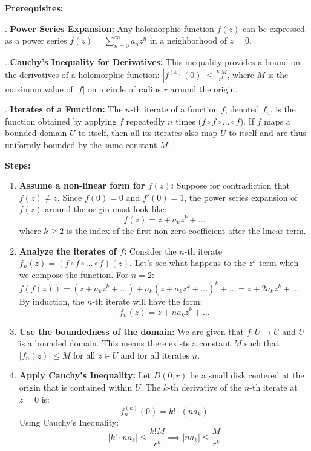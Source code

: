 \begin{solution}
\textbf{Prerequisites:}
\par{}. \textbf{Power Series Expansion:} Any holomorphic function $f(z)$ can be expressed as a power series $f(z) = \sum_{n=0}^\infty a_n z^n$ in a neighborhood of $z=0$.
\par{}. \textbf{Cauchy's Inequality for Derivatives:} This inequality provides a bound on the derivatives of a holomorphic function: $|f^{(k)}(0)| \leq \frac{k! M}{r^k}$, where $M$ is the maximum value of $|f|$ on a circle of radius $r$ around the origin.
\par{}. \textbf{Iterates of a Function:} The $n$-th iterate of a function $f$, denoted $f_n$, is the function obtained by applying $f$ repeatedly $n$ times ($f \circ f \circ \dots \circ f$). If $f$ maps a bounded domain $U$ to itself, then all its iterates also map $U$ to itself and are thus uniformly bounded by the same constant $M$.
\par\medskip
\textbf{Steps:}
\begin{enumerate}
    \item \textbf{Assume a non-linear form for $f(z)$:} Suppose for contradiction that $f(z) \neq z$. Since $f(0)=0$ and $f'(0)=1$, the power series expansion of $f(z)$ around the origin must look like:
    \[ f(z) = z + a_k z^k + \dots \]
    where $k \geq 2$ is the index of the first non-zero coefficient after the linear term.

    \item \textbf{Analyze the iterates of $f$:} Consider the $n$-th iterate $f_n(z) = (f \circ f \circ \dots \circ f)(z)$. Let's see what happens to the $z^k$ term when we compose the function. 
    For $n=2$: $f(f(z)) = (z + a_k z^k + \dots) + a_k (z + a_k z^k + \dots)^k + \dots = z + 2a_k z^k + \dots$ 
    By induction, the $n$-th iterate will have the form:
    \[ f_n(z) = z + n a_k z^k + \dots \]

    \item \textbf{Use the boundedness of the domain:} We are given that $f: U \to U$ and $U$ is a bounded domain. This means there exists a constant $M$ such that $|f_n(z)| \leq M$ for all $z \in U$ and for all iterates $n$.

    \item \textbf{Apply Cauchy's Inequality:} Let $D(0, r)$ be a small disk centered at the origin that is contained within $U$. The $k$-th derivative of the $n$-th iterate at $z=0$ is:
    \[ f_n^{(k)}(0) = k! \cdot (n a_k) \]
    Using Cauchy's Inequality:
    \[ |k! \cdot n a_k| \leq \frac{k! M}{r^k} \implies |n a_k| \leq \frac{M}{r^k} \]


\end{enumerate}
\end{solution}
